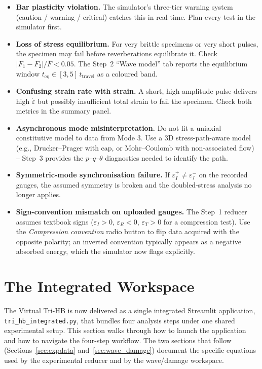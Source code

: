\documentclass[11pt,a4paper]{article}
\newcommand{\eps}{\varepsilon}
\newcommand{\epsdot}{\dot\eps}
\begin{document}
\begin{itemize}[leftmargin=*]
  \item \textbf{Bar plasticity violation.} The simulator's three-tier warning
        system (caution / warning / critical) catches this in real time. Plan
        every test in the simulator first.
  \item \textbf{Loss of stress equilibrium.} For very brittle specimens or
        very short pulses, the specimen may fail before reverberations
        equilibrate it. Check $|F_1 - F_2| / \bar F < 0.05$. The Step~2
        ``Wave model'' tab reports the equilibrium window
        $t_{\text{eq}} \in [3, 5]\,t_{\text{travel}}$ as a coloured band.
  \item \textbf{Confusing strain rate with strain.} A short, high-amplitude
        pulse delivers high $\epsdot$ but possibly insufficient total strain
        to fail the specimen. Check both metrics in the summary panel.
  \item \textbf{Asynchronous mode misinterpretation.} Do not fit a uniaxial
        constitutive model to data from Mode 3. Use a 3D stress-path-aware
        model (e.g., Drucker--Prager with cap, or Mohr--Coulomb with
        non-associated flow) -- Step~3 provides the $p$--$q$--$\theta$
        diagnostics needed to identify the path.
  \item \textbf{Symmetric-mode synchronisation failure.} If
        $\eps_I^+ \neq \eps_I^-$ on the recorded gauges, the assumed symmetry
        is broken and the doubled-stress analysis no longer applies.
  \item \textbf{Sign-convention mismatch on uploaded gauges.} The Step~1
        reducer assumes textbook signs ($\eps_I > 0$, $\eps_R < 0$,
        $\eps_T > 0$ for a compression test). Use the \emph{Compression
        convention} radio button to flip data acquired with the opposite
        polarity; an inverted convention typically appears as a negative
        absorbed energy, which the simulator now flags explicitly.
\end{itemize}

\newpage
\section{The Integrated Workspace}

The Virtual Tri-HB is now delivered as a single integrated Streamlit
application, \texttt{tri\_hb\_integrated.py}, that bundles four analysis
steps under one shared experimental setup. This section walks through how to
launch the application and how to navigate the four-step workflow. The two
sections that follow (Sections~\ref{sec:expdata} and~\ref{sec:wave_damage})
document the specific equations used by the experimental reducer and by the
wave/damage workspace.
\end{document}
